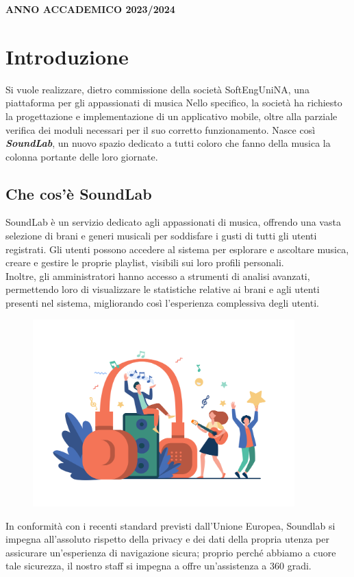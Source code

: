 \documentclass{article}
\begin{document}
	\vspace{0.5cm}
	
	\begin{center}
		\textbf{ANNO ACCADEMICO 2023/2024}
	\end{center}
	

	\renewcommand{\contentsname}{Indice} %
	\tableofcontents %
	
	\clearpage
	
	\section{Introduzione}
	Si vuole realizzare, dietro commissione della società SoftEngUniNA, una piattaforma per gli appassionati di musica
	Nello specifico, la società ha richiesto la progettazione e implementazione di un applicativo mobile, oltre alla parziale verifica dei moduli necessari per il suo corretto funzionamento.
	Nasce così \textbf{\textit{\textcolor{dark_purple}{SoundLab}}}, un nuovo spazio dedicato a tutti coloro che fanno della musica la colonna portante delle loro giornate.
		\subsection{Che cos'è SoundLab}
		SoundLab è un servizio dedicato agli appassionati di musica, offrendo una vasta selezione di brani e generi musicali per soddisfare i gusti di tutti gli utenti registrati. Gli utenti possono accedere al sistema per esplorare e ascoltare musica, creare e gestire le proprie playlist, visibili sui loro profili personali. \\Inoltre, gli amministratori hanno accesso a strumenti di analisi avanzati, permettendo loro di visualizzare le statistiche relative ai brani e agli utenti presenti nel sistema, migliorando così l'esperienza complessiva degli utenti.
		\\
		\begin{figure}[H]
			\centering
			\includegraphics[width=0.9\textwidth]{Immagini/5870}
		\end{figure}
		In conformità con i recenti standard previsti dall’Unione Europea, Soundlab si impegna all’assoluto rispetto della privacy e dei dati della propria utenza per assicurare un’esperienza di navigazione sicura; proprio perché abbiamo a cuore tale sicurezza, il nostro staff si impegna a offre un’assistenza a 360 gradi.
\end{document}

